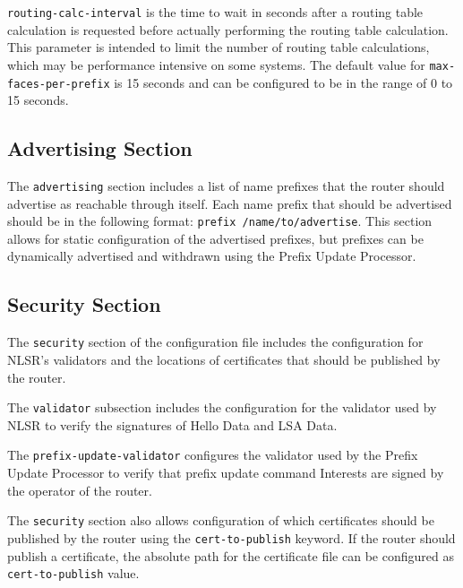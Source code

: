 \texttt{routing-calc-interval} is the time to wait in seconds after a routing table calculation is requested before actually performing the routing table calculation.
This parameter is intended to limit the number of routing table calculations, which may be performance intensive on some systems.
The default value for \texttt{max-faces-per-prefix} is 15 seconds and can be configured to be in the range of 0 to 15 seconds.

\subsection{Advertising Section}

The \texttt{advertising} section includes a list of name prefixes that the router should advertise as reachable through itself.
Each name prefix that should be advertised should be in the following format: \texttt{prefix /name/to/advertise}.
This section allows for static configuration of the advertised prefixes, but prefixes can be dynamically advertised and withdrawn using the Prefix Update Processor. 

\subsection{Security Section}

The \texttt{security} section of the configuration file includes the configuration for NLSR's validators and the locations of certificates that should be published by the router.

The \texttt{validator} subsection includes the configuration for the validator used by NLSR to verify the signatures of Hello Data and LSA Data.

The \texttt{prefix-update-validator} configures the validator used by the Prefix Update Processor to verify that prefix update command Interests are signed by the operator of the router.

The \texttt{security} section also allows configuration of which certificates should be published by the router using the \texttt{cert-to-publish} keyword.
If the router should publish a certificate, the absolute path for the certificate file can be configured as \texttt{cert-to-publish} value.
